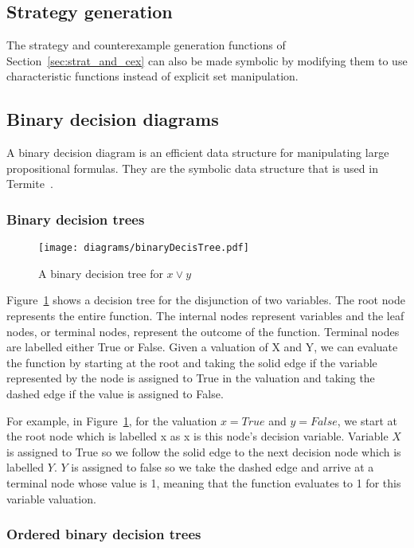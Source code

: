 \subsection{Strategy generation}

The strategy and counterexample generation functions of Section~\ref{sec:strat_and_cex} can also be made symbolic by modifying them to use characteristic functions instead of explicit set manipulation.

\subsection{Binary decision diagrams}

A binary decision diagram is an efficient data structure for manipulating large propositional formulas. They are the symbolic data structure that is used in Termite~\cite{Ryzhyk_WKLRSV_14}.

\subsubsection{Binary decision trees}

\begin{figure}[t]
\centering
\texttt{[image: diagrams/binaryDecisTree.pdf]}
\caption{A binary decision tree for $x \vee y$}
\label{fig:decis_tree}
\end{figure}

Figure~\ref{fig:decis_tree} shows a decision tree for the disjunction of two variables. The root node represents the entire function. The internal nodes represent variables and the leaf nodes, or terminal nodes, represent the outcome of the function. Terminal nodes are labelled either True or False. Given a valuation of X and Y, we can evaluate the function by starting at the root and taking the solid edge if the variable represented by the node is assigned to True in the valuation and taking the dashed edge if the value is assigned to False. 

For example, in Figure~\ref{fig:decis_tree}, for the valuation $x=True$ and $y=False$, we start at the root node which is labelled x as x is this node's decision variable. Variable $X$ is assigned to True so we follow the solid edge to the next decision node which is labelled $Y$. $Y$ is assigned to false so we take the dashed edge and arrive at a terminal node whose value is 1, meaning that the function evaluates to 1 for this variable valuation.

\subsubsection{Ordered binary decision trees}

